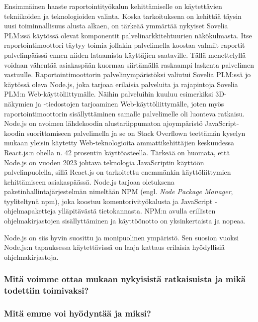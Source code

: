 Ensimmäinen haaste raportointityökalun kehittämiselle on käytettävien tekniikoiden ja teknologioiden valinta. Koska tarkoituksena on kehittää täysin uusi toiminnallisuus alusta alkaen, on tärkeää ymmärtää nykyiset Sovelia PLM:ssä käytössä olevat komponentit palvelinarkkitehtuurien näkökulmasta. Itse raportointimoottori täytyy toimia jollakin palvelimella koostaa valmiit raportit palvelinpäässä ennen niiden lataamista käyttäjien saataville. Tällä menettelyllä voidaan vähentää asiakaspään kuormaa siirtämällä raskaampi laskenta palvelimen vastuulle. Raportointimoottorin palvelinympäristöksi valiutui Sovelia PLM:ssä jo käytössä oleva Node.js, joka tarjoaa erilaisia palveluita ja rajapintoja Sovelia PLM:n Web-käyttöliittymälle. Näihin palveluihin kuuluu esimerkiksi 3D-näkymien ja -tiedostojen tarjoaminen Web-käyttöliittymälle, joten myös raportointimoottorin sisällyttäminen samalle palvelimelle oli luonteva ratkaisu. Node.js on avoimen lähdekoodin alustariippumaton ajoympäristö JavaScript-koodin suorittamiseen palvelimella ja se on Stack Overflown teettämän kyselyn mukaan yleisin käytetty Web-teknologioita ammattikehittäjien keskuudessa React.js:n ohella n. 42 prosentin käyttöasteella. \cite{stackoverflowStackOverflow} Tärkeää on huomata, että Node.js on vuoden 2023 johtava teknologia JavaScriptin käyttöön palvelinpuolella, sillä React.js on tarkoitettu enemmänkin käyttöliittymien kehittämiseen asiakaspäässä. Node.js tarjoaa oletuksena paketinhallintajärjestelmän nimeltään NPM (engl. \textit{Node Package Manager}, tyyliteltynä npm), joka koostuu komentorivityökalusta ja JavaScript -ohjelmapaketteja ylläpitävästä tietokannasta. NPM:n avulla erillisten ohjelmakirjastojen sisällyttäminen ja käyttöönotto on yksinkertaista ja nopeaa. \cite{npmjsAbout}

Node.js on siis hyvin suosittu ja monipuolinen ympäristö. Sen suosion vuoksi Node.js:n tapauksessa käytettävissä on laaja kattaus erilaisia hyödyllisiä ohjelmakirjastoja.

\subsubsection{Mitä voimme ottaa mukaan nykyisistä ratkaisuista ja mikä todettiin toimivaksi?}

\subsubsection{Mitä emme voi hyödyntää ja miksi?}

